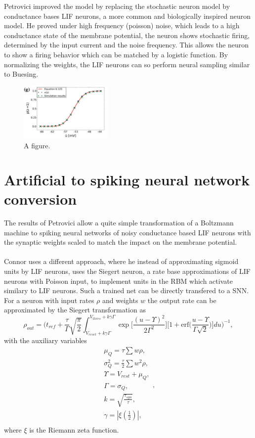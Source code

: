 Petrovici improved the model by replacing the stochastic neuron model by conductance bases LIF neurons, a more common and biologically inspired neuron model.
He proved under high frequency (poisson) noise, which leads to a high conductance state of the membrane potential, the neuron shows stochastic firing, determined by the input current and the noise frequency.
This allows the neuron to show a firing behavior which can be matched by a logistic function.  
By normalizing the weights, the LIF neurons can so perform neural sampling similar to Buesing.

\begin{figure}
	\centering
    	\includegraphics[width=0.4\textwidth]{imgs/snn_sample5.png} 
    \caption{A figure.}
	\label{fig:test}
\end{figure}

\section{Artificial to spiking neural network conversion}

The results of Petrovici allow a quite simple transformation of a Boltzmann machine to spiking neural networks of noisy conductance based LIF neurons with the synaptic weights scaled to match the impact on the membrane potential.
\\
\\
Connor uses a different approach, where he instead of approximating sigmoid units by LIF neurons, uses the Siegert neuron, a rate base approximations of LIF neurons with Poisson input, to implement units in the RBM which activate similary to LIF neurons. 
Such a trained net can be directly transfered to a SNN.
For a neuron with input rates $\rho$ and weights $w$ the output rate can be approximated by the Siegert transformation as
\[
\rho_{out} = \bigg(t_{ref} + \frac{\tau}{\Gamma} \sqrt{\frac{\pi}{2}} \int_{V_{reset}+k\gamma\Gamma}^{V_{thres}+k\gamma\Gamma} \exp \Big[ \frac{(u - \Upsilon)^2}{2 \Gamma^2} \Big] \Big[ 1 + \text{erf} \Big( \frac{u - \Upsilon}{\Gamma \sqrt{2}} \Big) \Big] du \bigg)^{-1},
\] 
with the auxiliary variables
\[
\begin{split}
	\mu_Q = \tau \sum w \rho ,\\
	\sigma_Q^2 = \frac{\tau}{2} \sum w^2 \rho,\\
	\Upsilon = V_{rest} + \mu_Q ,\\
	\Gamma = \sigma_Q ,\\
	k = \sqrt{\frac{\tau_{syn}}{\tau}},\\
	\gamma = |\xi(\frac{1}{2})|,\\
\end{split},
\]
where $\xi$ is the Riemann zeta function.

